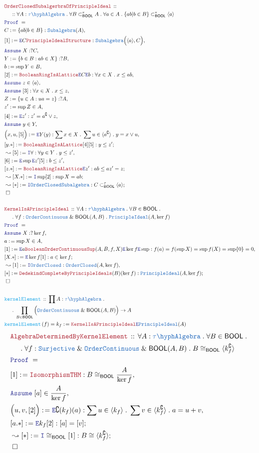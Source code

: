 \documentclass[12pt]{scrartcl}
\newcommand{\TYPE}[1]{\textcolor{NavyBlue}{\mathtt{#1}}}
\newcommand{\FUNC}[1]{\textcolor{Cerulean}{\mathtt{#1}}}
\newcommand{\LOGIC}[1]{\textcolor{Blue}{\mathtt{#1}}}
\newcommand{\THM}[1]{\textcolor{Maroon}{\mathtt{#1}}}
\renewcommand{\.}{\; . \;}
\newcommand{\de}{: \kern 0.1pc =}
\newcommand{\Act}[1]{\left( #1 \right)}
\newcommand{\Theorem}[2]{& \THM{#1} \, :: \, #2 \\ & \Proof = \\ }
\newcommand{\DeclareFunc}[2]{& \FUNC{#1} \, :: \, #2 \\}
\newcommand{\DefineNamedFunc}[4]{&  \FUNC{#1}\Act{#2} = #3 \de #4 \\}
\newcommand{\NewLine}{\\ & \kern 1pc}
\newcommand{\Page}[1]{ \begin{align*} #1 \end{align*}   }
\renewcommand{\And}{\; \& \;}
\newcommand{\Intro}{\LOGIC{I}}
\newcommand{\Elim}{\LOGIC{E}}
\newcommand{\Surj}{\TYPE{Surjective}}
\renewcommand{\c}{\complement}
\newcommand{\Say}[3]{& #1 \de #2 : #3, \\}
\newcommand{\SayIn}[3]{& #1 \de #2 \in #3, \\}
\newcommand{\Conclude}[3]{& #1 \de #2 : #3; \\}
\newcommand{\Derive}[3]{& \leadsto #1 \de #2 : #3, \\}
\newcommand{\DeriveConclude}[3]{& \leadsto #1 \de #2 : #3 ; \\}
\newcommand{\Assume}[2]{& \LOGIC{Assume} \; #1 : #2, \\}
\newcommand{\AssumeIn}[2]{& \LOGIC{Assume} \; #1 \in #2, \\}
\newcommand{\QED}{\; \square}
\newcommand{\EndProof}{& \QED \\}
\newcommand{\Proof}{\LOGIC{Proof} \; }
\newcommand{\Principle}{\TYPE{PrincipleIdeal}}
\newcommand{\OC}{\TYPE{OrderClosed}}
\newcommand{\oC}{\TYPE{OrderContinuous}}
\newcommand{\TAlgebra}{\TYPE{\tau\hyph Algebra}}
\newcommand{\BOOL}{\mathsf{BOOL}}
\begin{document}
\Page{
	\Theorem{OrderClosedSubalgerbraOfPrincipleIdeal}
	{
		\NewLine ::		
		\forall A : \TAlgebra \.
		\forall B \subset_\BOOL^\tau A \.
		\forall a \in A \.
		\{ ab | b \in B \} \subset_\BOOL^\tau \langle a \rangle
	}
	\Say{C}{\{ab | b \in B \}}{\TYPE{Subalgebra}(A)}
	\Say{[1]}{
		\Elim C 
		\THM{PrincipleIdealStructure}
	}
	{
		\TYPE{Subalgebra}\Big(\langle a \rangle, C\Big)
	}
	\Assume{X}{?C}
	\Say{Y}{\{ b \in B : ab \in X \}}{?B}
	\SayIn{b}{\sup Y}{B}
	\Say{[2]}{\THM{BooleanRingIsALattice}\Elim C \Elim b}
	{
		\forall x \in X \. x \le ab
	}
	\AssumeIn{z}{\langle a \rangle}
	\Assume{[3]}{\forall x \in X \. x \le z}
	\Say{Z}{ \{ u \in A : ua = z \}}{?A}
	\SayIn{z'}{\sup Z}{A}
	\Say{[4]}{\Elim z'}{ z' = a^\c \vee z}
	\AssumeIn{y}{Y}
	\Say{\Big(x,u,[5]\Big)}{\Elim Y(y)}
	{
		\sum x \in X \. \sum u \in \langle a^\c \rangle \.
		y = x \vee u
	}
	\Conclude{[y.*]}{\THM{BooleanRingIsALattice}[4][5]}
	{
		 y \le z'
	}
	\Derive{[5]}{\Intro \forall}
	{
		\forall	y \in Y \. y \le z'
	}
	\Say{[6]}{\Elim \sup \Elim z' [5]}{b \le z'}
	\Conclude{[z.*]}{\THM{BooleanRingIsALattice}\Elim z'}
	{
		ab \le az' = z
	}
	\DeriveConclude{[X.*]}{\Intro \sup [2]}{ \sup X = ab}
	\DeriveConclude{[*]}{\Intro \TYPE{OrderClosedSubalgebra}}
	{
		C \subset_\BOOL^\tau \langle a \rangle
	}
	\EndProof
	\\
	\Theorem{KernelIsAPrincipleIdeal}
	{
		\forall A : \TAlgebra \.
		\forall B \in \BOOL \. \NewLine \. 
		\forall f : \oC \And \BOOL(A,B) \.
		\Principle(A,\ker f)
	}
	\Assume{X}{? \ker f}
	\SayIn{a}{\sup X}{A}
	\Say{[1]}{\Elim a \THM{BooleanOrderContinuousSup}(A,B,f,X) \Elim \ker f \Elim \sup}
	{
		f(a) = 
		f(\sup X) =
		\sup f(X) =
		\sup \{0\} =
		0 
	}
	\Conclude{[X.*]}{\Elim \ker f [1]}{a \in \ker f}
	\Derive{[1]}{\Intro \OC}{\OC(A,\ker f)}
	\Conclude{[*]}{\THM{DedekindCompleteByPrincipleIdeals}(B)(\ker f)}
	{
			\Principle(A,\ker f)
	}
	\EndProof
	\\
	\DeclareFunc{kernelElement}{
		\prod A : \TAlgebra \. \NewLine \.
		\prod_{B \in \BOOL} 
		\Big(\oC \And \BOOL(A,B)\Big)	\to A
	}
	\DefineNamedFunc{kernelElement}{f}{k_f}
	{\THM{KernelIsAPrincipleIdeal}\Elim \Principle(A)}
}
\Page{
	\Theorem{AlgebraDeterminedByKernelElement}
	{
		\forall A : \TAlgebra \.
		\forall B \in \BOOL \. \NewLine \. 
		\forall f : \Surj \And \oC \And \BOOL(A,B) \.
		B \cong_\BOOL \langle k_f^\c \rangle
	}
	\Say{[1]}{\THM{IsomorphismTHM}}
	{
		B \cong_\BOOL \frac{A}{\ker f}
	}
	\AssumeIn{[a]}{\frac{A}{\ker f}}
	\Say{\Big( u,v, [2] \Big)}{\Elim \c (k_f)(a)}
	{
		\sum u \in \langle k_f \rangle \.
		\sum v \in \langle k_f^\c \rangle \.
		a = u + v
	}
	\Conclude{[a.*]}{\Elim k_f [2]}{ [a] = [v]  }
	\DeriveConclude{[*]}{\Intro \cong_\BOOL [1]}
	{
			B \cong \langle k^\c_f \rangle
	}
	\EndProof
}
\newpage
\end{document}
